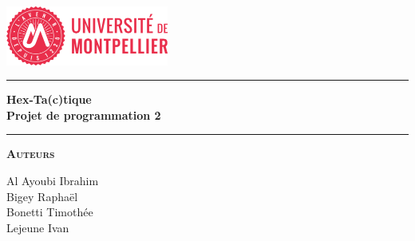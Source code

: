 \begin{titlepage}
\begin{center}
\vspace{2cm}
\includegraphics[width=0.4\textwidth]{root/UM1.png}~\\[1cm]
\vspace{2cm}

\hrule
\vspace{.5cm}
{\huge\bfseries{Hex-Ta(c)tique\\Projet de programmation 2}} %
\vspace{.5cm}

\hrule
\vspace{1.5cm}

\textsc{\textbf{Auteurs}}\\
\vspace{.5cm}
\centering

Al Ayoubi Ibrahim\\
Bigey Raphaël\\
Bonetti Timothée\\
Lejeune Ivan\\

\vspace{4cm}

\centering {} %
\end{center}
\end{titlepage}
